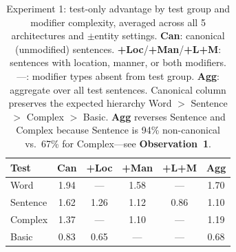 \begin{table}[t]
\centering
\vspace{-0.5em}
\small
\begin{tabular}{@{}lccccc@{}}
\toprule
\textbf{Test} & \textbf{Can} & \textbf{+Loc} & \textbf{+Man} & \textbf{+L+M} & \textbf{Agg} \\
\midrule
Word & 1.94 & --- & 1.58 & --- & 1.70 \\
Sentence & 1.62 & 1.26 & 1.12 & 0.86 & 1.10 \\
Complex & 1.37 & --- & 1.10 & --- & 1.19 \\
Basic & 0.83 & 0.65 & --- & --- & 0.68 \\
\bottomrule
\end{tabular}
\vspace{-0.7em}
\caption{\small Experiment 1: test-only advantage by test group and modifier complexity, averaged across all 5 architectures and $\pm$entity settings. \textbf{Can}: canonical (unmodified) sentences. \textbf{+Loc}/\textbf{+Man}/\textbf{+L+M}: sentences with location, manner, or both modifiers. ---: modifier types absent from test group. \textbf{Agg}: aggregate over all test sentences. Canonical column preserves the expected hierarchy Word $>$ Sentence $>$ Complex $>$ Basic. \textbf{Agg} reverses Sentence and Complex because Sentence is 94\% non-canonical vs.\ 67\% for Complex---see \textbf{Observation~1}.}
\label{tab:complexity_breakdown}
\end{table}
